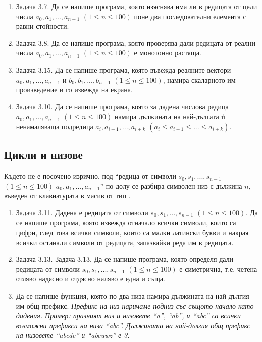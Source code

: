 {\begin{enumerate}[]
		\item Задача 3.7. \cite{sbornik} Да се напише програма, която изяснява има ли в редицата от цели числа $a_0, a_1, ..., a_{n-1}$ $(1 \leq n \leq 100)$ поне два последователни елемента с равни стойности.

		\item Задача 3.8. \cite{sbornik} Да се напише програма, която проверява дали редицата от реални числа $a_0, a_1, ..., a_{n-1}$ $(1 \leq n \leq 100)$ е монотонно растяща.

    \item Задача 3.15. \cite{sbornik} Да се напише програма, която въвежда реалните вектори $a_0, a_1, ..., a_{n-1}$ и $b_0, b_1, ..., b_{n-1}$ $(1 \leq n \leq 100)$,  намира скаларното им произведение  и го извежда на екрана.

		\item Задача 3.10. \cite{sbornik} Да се напише програма, която за дадена числова редица $a_0, a_1, ..., a_{n-1}$ $(1 \leq n \leq 100)$ намира дължината на най-дългата ú ненамаляваща подредица $a_i, a_{i+1}, ..., a_{i+k}$ $(a_i \leq a_{i+1} \leq ... \leq a_{i+k})$.


\end{enumerate}

\subsection {Цикли и низове}
Където не е посочено изрично, под ``редица от символи $s_0, s_1, ..., s_{n-1}$ $(1 \leq n \leq 100)$ $a_0, a_1, ..., a_{n-1}$'' по-долу се разбира символен низ с дължина $n$, въведен от клавиатурата в масив от тип .

\begin{enumerate}[resume]


  \item Задача 3.11. \cite{sbornik}	Дадена е редицата от символи $s_0, s_1, ..., s_{n-1}$ $(1 \leq n \leq 100)$. Да се напише програма, която извежда отначало всички символи, които са цифри, след това всички символи, които са малки латински букви и накрая всички останали символи от редицата, запазвайки реда им в редицата.

	\item Задача 3.13. \cite{sbornik} Задача 3.13. Да се напише програма, която определя дали редицата от символи $s_0, s_1, ..., s_{n-1}$ $(1 \leq n \leq 100)$ е симетрична, т.е. четена отляво надясно и отдясно наляво е една и съща.

  \item Да се напише функция, която по два низа намира дължината на най-дългия им общ префикс. \textit{Префикс на низ наричаме подниз със същото начало като дадения. Пример: празният низ и низовете ``a'', ``ab'', и ``abc'' са всички възможни префикси на низа ``abc''. Дължината на най-дългия общ префикс на низовете ``abcde'' и ``abcuwz'' е 3.}


\end{enumerate}}

